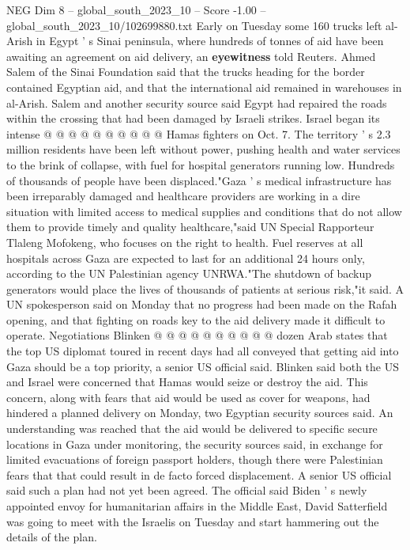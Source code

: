 \begin{textsample}{NEG Dim 8 – global\_south\_2023\_10 – Score -1.00 – global\_south\_2023\_10/102699880.txt}
Early on Tuesday some 160 trucks left al-Arish in Egypt ' s Sinai peninsula, where hundreds of tonnes of aid have been awaiting an agreement on aid delivery, an \textbf{eyewitness} told Reuters.
Ahmed Salem of the Sinai Foundation said that the trucks heading for the border contained Egyptian aid, and that the international aid remained in warehouses in al-Arish.
Salem and another security source said Egypt had repaired the roads within the crossing that had been damaged by Israeli strikes.
Israel began its intense @ @ @ @ @ @ @ @ @ @ Hamas fighters on Oct. 7.
The territory ' s 2.3 million residents have been left without power, pushing health and water services to the brink of collapse, with fuel for hospital generators running low.
Hundreds of thousands of people have been displaced."Gaza ' s medical infrastructure has been irreparably damaged and healthcare providers are working in a dire situation with limited access to medical supplies and conditions that do not allow them to provide timely and quality healthcare,"said UN Special Rapporteur Tlaleng Mofokeng, who focuses on the right to health.
Fuel reserves at all hospitals across Gaza are expected to last for an additional 24 hours only, according to the UN Palestinian agency UNRWA."The shutdown of backup generators would place the lives of thousands of patients at serious risk,"it said.
A UN spokesperson said on Monday that no progress had been made on the Rafah opening, and that fighting on roads key to the aid delivery made it difficult to operate.
Negotiations Blinken @ @ @ @ @ @ @ @ @ @ dozen Arab states that the top US diplomat toured in recent days had all conveyed that getting aid into Gaza should be a top priority, a senior US official said.
Blinken said both the US and Israel were concerned that Hamas would seize or destroy the aid.
This concern, along with fears that aid would be used as cover for weapons, had hindered a planned delivery on Monday, two Egyptian security sources said.
An understanding was reached that the aid would be delivered to specific secure locations in Gaza under monitoring, the security sources said, in exchange for limited evacuations of foreign passport holders, though there were Palestinian fears that that could result in de facto forced displacement.
A senior US official said such a plan had not yet been agreed.
The official said Biden ' s newly appointed envoy for humanitarian affairs in the Middle East, David Satterfield was going to meet with the Israelis on Tuesday and start hammering out the details of the plan.

\end{textsample}
